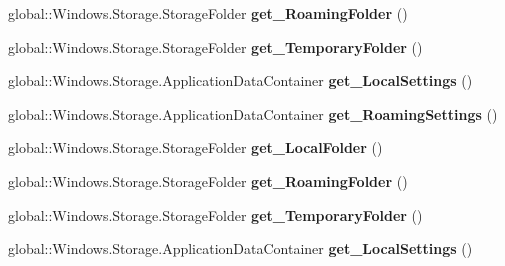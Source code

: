 \begin{DoxyCompactItemize}
global\+::\+Windows.\+Storage.\+Storage\+Folder {\bfseries get\+\_\+\+Roaming\+Folder} ()
\item 
\mbox{\label{interface_windows_1_1_storage_1_1_i_application_data_a7cc8d124ebf36fe0c0d96117a3e09ff2}} 
global\+::\+Windows.\+Storage.\+Storage\+Folder {\bfseries get\+\_\+\+Temporary\+Folder} ()
\item 
\mbox{\label{interface_windows_1_1_storage_1_1_i_application_data_ad910253c6d0b20d011dce17a29c99e02}} 
global\+::\+Windows.\+Storage.\+Application\+Data\+Container {\bfseries get\+\_\+\+Local\+Settings} ()
\item 
\mbox{\label{interface_windows_1_1_storage_1_1_i_application_data_a06655cd8ae7b5ba39077359585d19cea}} 
global\+::\+Windows.\+Storage.\+Application\+Data\+Container {\bfseries get\+\_\+\+Roaming\+Settings} ()
\item 
\mbox{\label{interface_windows_1_1_storage_1_1_i_application_data_ae3fadf1db189f66f22c74d1ee0e4b1bc}} 
global\+::\+Windows.\+Storage.\+Storage\+Folder {\bfseries get\+\_\+\+Local\+Folder} ()
\item 
\mbox{\label{interface_windows_1_1_storage_1_1_i_application_data_a408ead99bd13a953bad06b2efaba4fb0}} 
global\+::\+Windows.\+Storage.\+Storage\+Folder {\bfseries get\+\_\+\+Roaming\+Folder} ()
\item 
\mbox{\label{interface_windows_1_1_storage_1_1_i_application_data_a7cc8d124ebf36fe0c0d96117a3e09ff2}} 
global\+::\+Windows.\+Storage.\+Storage\+Folder {\bfseries get\+\_\+\+Temporary\+Folder} ()
\item 
\mbox{\label{interface_windows_1_1_storage_1_1_i_application_data_ad910253c6d0b20d011dce17a29c99e02}} 
global\+::\+Windows.\+Storage.\+Application\+Data\+Container {\bfseries get\+\_\+\+Local\+Settings} ()
\item 
\mbox{\label{interface_windows_1_1_storage_1_1_i_application_data_a06655cd8ae7b5ba39077359585d19cea}} 

\end{DoxyCompactItemize}
